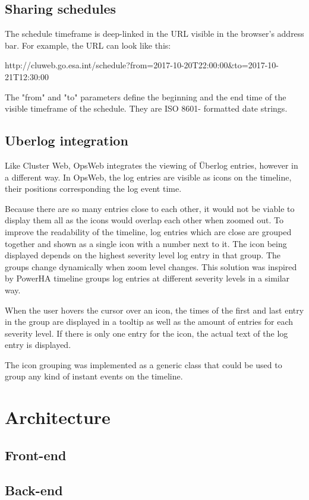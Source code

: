 \subsection{Sharing schedules}
The schedule timeframe is deep-linked in the URL visible in the browser's address bar. For example, the URL can look like this:

http://cluweb.go.esa.int/schedule?from=2017-10-20T22:00:00\&to=2017-10-21T12:30:00

The "from" and "to" parameters define the beginning and the end time of the visible timeframe of the schedule. They are ISO 8601- formatted date strings.


\subsection{Uberlog integration}
Like Cluster Web, OpsWeb integrates the viewing of Überlog entries, however in a different way. In OpsWeb, the log entries are visible as icons on the timeline, their positions corresponding the log event time. 

Because there are so many entries close to each other, it would not be viable to display them all as the icons would overlap each other when zoomed out. To improve the readability of the timeline, log entries which are close are grouped together and shown as a single icon with a number next to it. The icon being displayed depends on the highest severity level log entry in that group. The groups change dynamically when zoom level changes. This solution was inspired by PowerHA timeline groups log entries at different severity levels in a similar way. \cite{ibm_timeline}

When the user hovers the cursor over an icon, the times of the first and last entry in the group are displayed in a tooltip as well as the amount of entries for each severity level. If there is only one entry for the icon, the actual text of the log entry is displayed.

The icon grouping was implemented as a generic class that could be used to group any kind of instant events on the timeline.
\section{Architecture}
\subsection{Front-end}
\subsection{Back-end}
